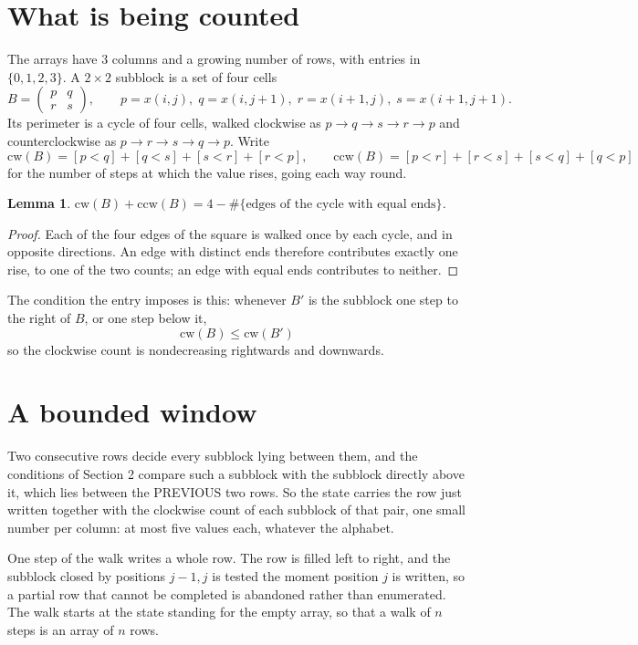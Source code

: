 \documentclass[11pt,a4paper]{article}
\theoremstyle{plain}
\newtheorem{lemma}[theorem]{Lemma}
\theoremstyle{definition}
\begin{document}
\section{What is being counted}

The arrays have $3$ columns and a growing number of rows, with entries in $\{0,1,2,3\}$. A
$2\times2$ subblock is a set of four cells
\[
B=\begin{pmatrix} p & q \\ r & s \end{pmatrix},
\qquad p=x(i,j),\; q=x(i,j+1),\; r=x(i+1,j),\; s=x(i+1,j+1).
\]
Its perimeter is a cycle of four cells, walked clockwise as $p\to q\to s\to r\to p$ and
counterclockwise as $p\to r\to s\to q\to p$. Write
\[
\mathrm{cw}(B)=[p<q]+[q<s]+[s<r]+[r<p],\qquad
\mathrm{ccw}(B)=[p<r]+[r<s]+[s<q]+[q<p]
\]
for the number of steps at which the value rises, going each way round.

\begin{lemma}\label{lem:sum}
$\mathrm{cw}(B)+\mathrm{ccw}(B)=4-\#\{\text{edges of the cycle with equal ends}\}$.
\end{lemma}

\begin{proof}
Each of the four edges of the square is walked once by each cycle, and in opposite directions.
An edge with distinct ends therefore contributes exactly one rise, to one of the two counts;
an edge with equal ends contributes to neither.
\end{proof}

The condition the entry imposes is this: whenever $B'$ is the subblock one step to the right of $B$, or one step below it, 
\[
\mathrm{cw}(B)\le\mathrm{cw}(B')
\]
so the clockwise count is nondecreasing rightwards and downwards.

\section{A bounded window}

Two consecutive rows decide every subblock lying between them, and the conditions of Section 2 compare such a subblock with the subblock directly above it, which lies between the PREVIOUS two rows. So the state carries the row just written together with the clockwise count of each subblock of that pair, one small number per column: at most five values each, whatever the alphabet.

One step of the walk writes a whole row. The row is filled left to right, and the subblock
closed by positions $j-1,j$ is tested the moment position $j$ is written, so a partial row that
cannot be completed is abandoned rather than enumerated. The walk starts at the state standing
for the empty array, so that a walk of $n$ steps is an array of $n$ rows.
\end{document}
